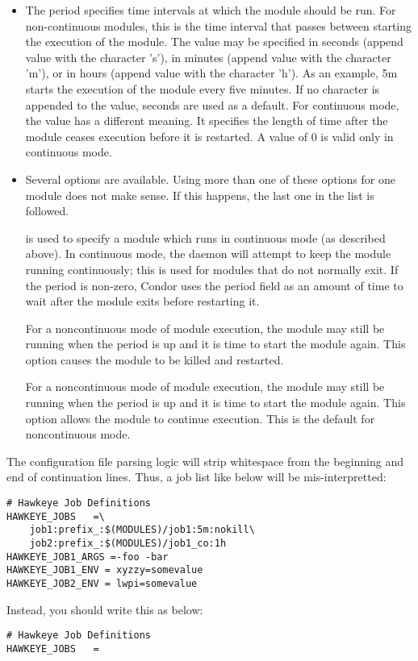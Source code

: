\begin{description}
\begin{itemize}
    \item {} The period specifies time intervals at
    which the module should be run.
    For non-continuous modules, this
    is the time interval that passes between starting the execution
    of the module.
    The value may be specified in seconds (append value with the character 's'),
    in minutes (append value with the character 'm'),
    or in hours (append value with the character 'h').
    As an example, 5m starts the execution of the module every five minutes.
    If no character is appended to the value, seconds are used as a default.
    For continuous mode, the value has a different meaning.
    It specifies the length of time after the module ceases execution
    before it is restarted.
    A value of 0 is valid only in continuous mode.

   \item Several options are available. Using more than one
   of these options for one module does not make sense.  If this happens,
   the last one in the list is followed.

	 is used to specify a module which runs in continuous
	mode (as described above).
	In continuous mode, the  daemon will
	attempt to keep the module running continuously;
	this is used for modules that do not normally exit.
	If the period is non-zero, Condor uses the period field as
	an amount of time to wait after
	the module exits before restarting it.

	For a noncontinuous mode of module execution,
	the module may still be running when the period is up
	and it is time to start the module again.
	This option causes the module to be killed and restarted.

	For a noncontinuous mode of module execution,
	the module may still be running when the period is up
	and it is time to start the module again.
	This option allows the module to continue execution.
	This is the default for noncontinuous mode.
	
  \end{itemize}
\Note The configuration file parsing logic will strip whitespace from
the beginning and end of continuation lines.  Thus, a job list like
below will be mis-interpretted:
\begin{verbatim}
# Hawkeye Job Definitions
HAWKEYE_JOBS   =\
    job1:prefix_:$(MODULES)/job1:5m:nokill\
    job2:prefix_:$(MODULES)/job1_co:1h
HAWKEYE_JOB1_ARGS =-foo -bar
HAWKEYE_JOB1_ENV = xyzzy=somevalue
HAWKEYE_JOB2_ENV = lwpi=somevalue
\end{verbatim}
Instead, you should write this as below:
\begin{verbatim}
# Hawkeye Job Definitions
HAWKEYE_JOBS   =


\end{verbatim}
\end{description}
